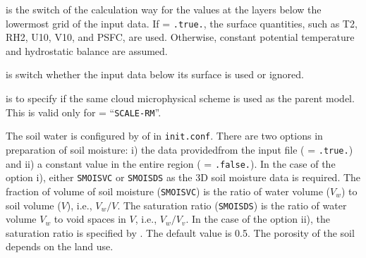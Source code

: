  is the switch of the calculation way for the values at the \scale layers below the lowermost grid of the input data.
If  = \verb|.true.|, the surface quantities, such as T2, RH2, U10, V10, and PSFC, are used.
Otherwise, constant potential temperature and hydrostatic balance are assumed.

 is switch whether the input data below its surface is used or ignored.

 is to specify if the same cloud microphysical scheme is used as the parent model.
This is valid only for  = ``\verb|SCALE-RM|''.


The soil water is configured by  of  in \verb|init.conf|.
There are two options in preparation of soil moisture: i) the data providedfrom the input file ( = \verb|.true.|) and ii) a constant value in the entire region ( = \verb|.false.|).
In the case of the option i), either \verb|SMOISVC| or \verb|SMOISDS| as the 3D soil moisture data is required.
The fraction of volume of soil moisture (\verb|SMOISVC|) is the ratio of water volume ($V_w$) to soil volume ($V$), i.e., $V_w / V$.
The saturation ratio (\verb|SMOISDS|) is the ratio of water volume $V_w$ to void spaces in $V$, i.e., $V_w / V_v$.
%
In the case of the option ii), the saturation ratio is specified by .
The default value is 0.5.
The porosity of the soil depends on the land use.



